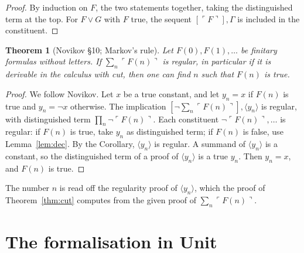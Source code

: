 \documentclass[11pt]{amsart}
\newtheorem{theorem}{Theorem}[section]
\theoremstyle{definition}
\theoremstyle{remark}
\newcommand{\seq}[1]{\langle #1\rangle}
\newcommand{\one}[1]{[#1]}
\begin{document}
\begin{proof}
  By induction on $F$, the two statements together, taking the
  distinguished term at the top. For $F\vee G$ with $F$ true, the sequent
  $\one{\ulcorner F\urcorner},\Gamma$ is included in the constituent.
\end{proof}

\begin{theorem}[Novikov \S10; Markov's rule]\label{thm:markov}
  Let $F(0),F(1),\dots$ be finitary formulas without letters. If $\sum_n\ulcorner
  F(n)\urcorner$ is regular, in particular if it is derivable in the
  calculus with cut, then one can find $n$ such that $F(n)$ is true.
\end{theorem}

\begin{proof}
  We follow Novikov. Let $x$ be a true constant, and let $y_n=x$ if $F(n)$
  is true and $y_n=\neg x$ otherwise. The implication
  $\one{\neg\sum_n\ulcorner F(n)\urcorner},\seq{y_n}$ is regular, with
  distinguished term $\prod_n\neg\ulcorner F(n)\urcorner$. Each
  constituent $\neg\ulcorner F(n)\urcorner,\dots$ is regular: if $F(n)$
  is true, take $y_n$ as distinguished term; if $F(n)$ is false, use
  Lemma~\ref{lem:dec}. By the Corollary, $\seq{y_n}$ is regular. A
  summand of $\seq{y_n}$ is a constant, so the distinguished term of a
  proof of $\seq{y_n}$ is a true $y_n$. Then $y_n=x$, and $F(n)$ is true.
\end{proof}

The number $n$ is read off the regularity proof of $\seq{y_n}$, which the
proof of Theorem~\ref{thm:cut} computes from the given proof of
$\sum_n\ulcorner F(n)\urcorner$.

\section{The formalisation in Unit}\label{sec:unit}
\end{document}
